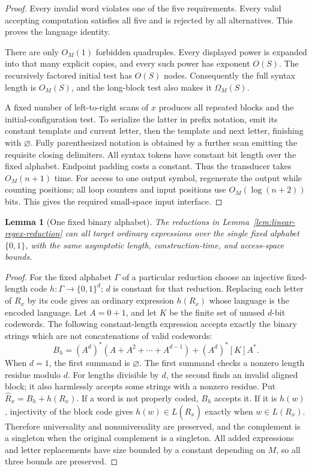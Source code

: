 \documentclass[11pt]{article}
\newtheorem{lemma}[theorem]{Lemma}
\theoremstyle{definition}
\theoremstyle{remark}
\begin{document}
\begin{proof}
Every invalid word violates one of the five requirements. Every valid
accepting computation satisfies all five and is rejected by all
alternatives. This proves the language identity.

There are only $O_M(1)$ forbidden quadruples. Every displayed power is
expanded into that many explicit copies, and every such power has
exponent $O(S)$. The recursively factored initial test has $O(S)$ nodes.
Consequently the full syntax length is $O_M(S)$, and the long-block test
also makes it $\Omega_M(S)$.

A fixed number of left-to-right scans of $x$ produces all repeated
blocks and the initial-configuration test. To serialize the latter
in prefix notation, emit its constant template and current letter,
then the template and next letter, finishing with $\varnothing$.
Fully parenthesized notation is obtained by a further scan emitting
the requisite closing delimiters. All syntax tokens have constant
bit length over the fixed alphabet. Endpoint padding costs a constant.
Thus the transducer takes $O_M(n+1)$ time.
For access to one output symbol, regenerate the output while counting
positions; all loop counters and input positions use $O_M(\log(n+2))$
bits. This gives the required small-space input interface.
\end{proof}

\begin{lemma}[One fixed binary alphabet]
\label{lem:regex-binary}
The reductions in Lemma~\ref{lem:linear-regex-reduction} can all target
ordinary expressions over the single fixed alphabet $\{0,1\}$, with
the same asymptotic length, construction-time, and access-space bounds.
\end{lemma}
\begin{proof}
For the fixed alphabet $\Gamma$ of a particular reduction choose an
injective fixed-length code $h:\Gamma\to\{0,1\}^d$; $d$ is constant
for that reduction. Replacing each letter of $R_x$ by its code gives
an ordinary expression $h(R_x)$ whose language is the encoded language.
Let $A=0+1$, and let $K$ be the finite set of unused $d$-bit codewords.
The following constant-length expression accepts exactly the binary
strings which are not concatenations of valid codewords:
\[
 B_h=(A^d)^*(A+A^2+\cdots+A^{d-1})
       +(A^d)^*[K]A^*.
\]
When $d=1$, the first summand is $\varnothing$. The first summand
checks a nonzero length residue modulo $d$. For lengths divisible by
$d$, the second finds an invalid aligned block; it also harmlessly
accepts some strings with a nonzero residue.
Put $\widehat R_x=B_h+h(R_x)$. If a word is not properly coded,
$B_h$ accepts it. If it is $h(w)$, injectivity of the block code gives
$h(w)\in L(\widehat R_x)$ exactly when $w\in L(R_x)$.
Therefore universality and nonuniversality are preserved, and the
complement is a singleton when the original complement is a singleton.
All added expressions and letter replacements have size bounded by a
constant depending on $M$, so all three bounds are preserved.
\end{proof}
\end{document}
